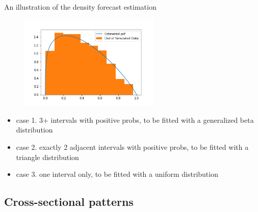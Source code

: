 \documentclass{beamer}
\begin{document}
\begin{frame}{An illustration of the density forecast estimation}
	\begin{figure}
		\centering
		\label{fig: dens_est_illutration}
			\includegraphics[width=0.6\textwidth]{figures/dens_est_illutration.png}
	\end{figure}

\begin{itemize}
	\item  case 1. 3+ intervals with positive probs, to be fitted with a generalized beta distribution
	\item case 2. exactly 2 adjacent intervals with positive probs, to be fitted with a triangle distribution 
	\item case 3. one interval only, to be fitted with a uniform distribution
\end{itemize}

\end{frame}




\subsection{Cross-sectional patterns}



\end{document}
